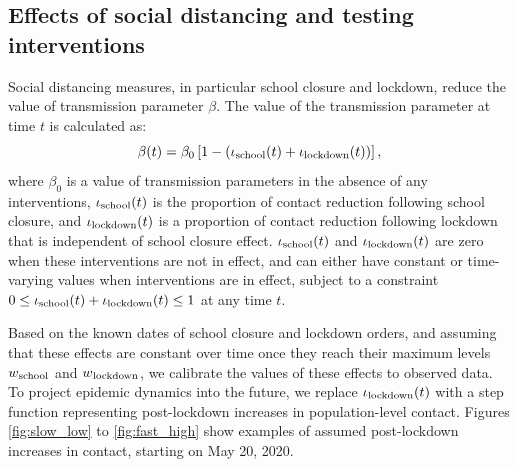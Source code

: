 \documentclass[11pt]{article}
\begin{document}


\subsection{Effects of social distancing and testing interventions} 

Social distancing measures, in particular school closure and lockdown, reduce the value of transmission parameter $\beta$. The value of the transmission parameter at time $t$ is calculated as:
\[ \beta(t) = \beta_0 \left[ 1 - ( \iota\textsubscript{school}(t) + \iota\textsubscript{lockdown} (t)) \right] , \]
where $\beta_0$ is a value of transmission parameters in the absence of any interventions, $\iota\textsubscript{school}(t)$ is the proportion of contact reduction following school closure, and $\iota\textsubscript{lockdown} (t)$ is a proportion of contact reduction following lockdown that is independent of school closure effect. $\iota\textsubscript{school}(t)$ and $\iota\textsubscript{lockdown} (t)$ are zero when these interventions are not in effect, and can either have constant or time-varying values when interventions are in effect, subject to a constraint $ 0 \le \iota\textsubscript{school}(t) + \iota\textsubscript{lockdown} (t) \le 1 $ at any time $t$.

Based on the known dates of school closure and lockdown orders, and assuming that these effects are constant over time once they reach their maximum levels $w\textsubscript{school}$ and $w\textsubscript{lockdown}$, we calibrate the values of these effects to observed data. To project epidemic dynamics into the future, we replace  $\iota\textsubscript{lockdown} (t)$ with a step function representing post-lockdown increases in population-level contact.  Figures \ref{fig:slow_low} to \ref{fig:fast_high} show examples of assumed post-lockdown increases in contact, starting on May 20, 2020. 
\end{document}
